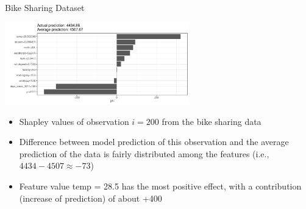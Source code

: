 \documentclass[11pt,compress,t,notes=noshow, aspectratio=169, xcolor=table]{beamer}
\begin{document}

\begin{frame}{Bike Sharing Dataset}

\begin{center}
\includegraphics[width=0.6\textwidth]{figure/shapley-bike.pdf}%
\end{center}

\begin{itemize}
    \item Shapley values of observation $i = 200$ from the bike sharing data
    \item Difference between model prediction of this observation and the average prediction of the data is fairly distributed among the features (i.e., $4434 - 4507 \approx -73 $)
    \item Feature value temp = 28.5 has the most positive effect, with a contribution (increase of prediction) of about +400
\end{itemize}
\end{frame}


\end{document}
